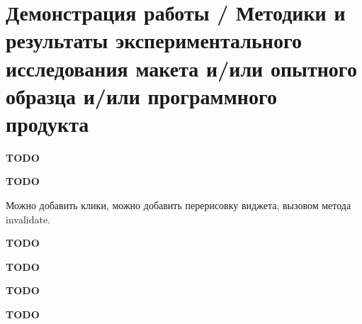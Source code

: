 \documentclass[a4paper,14pt]{extarticle} %
\begin{document}
	\newpage
	\section{Демонстрация работы / Методики и результаты экспериментального исследования макета и/или опытного образца и/или программного продукта}
	
	\textbf{\Huge TODO}
	
	\newpage
	
	\textbf{\Huge TODO}
	
	\newpage
	
	Можно добавить клики, можно добавить перерисовку виджета, вызовом метода invalidate.
	
	\textbf{\Huge TODO}
	
	\newpage
	
	\textbf{\Huge TODO}

	\newpage
	
	\textbf{\Huge TODO}
	
	\newpage
	
	\printbibliography[heading=none]
	
	\newpage
	
	\textbf{\Huge TODO}
\end{document}
